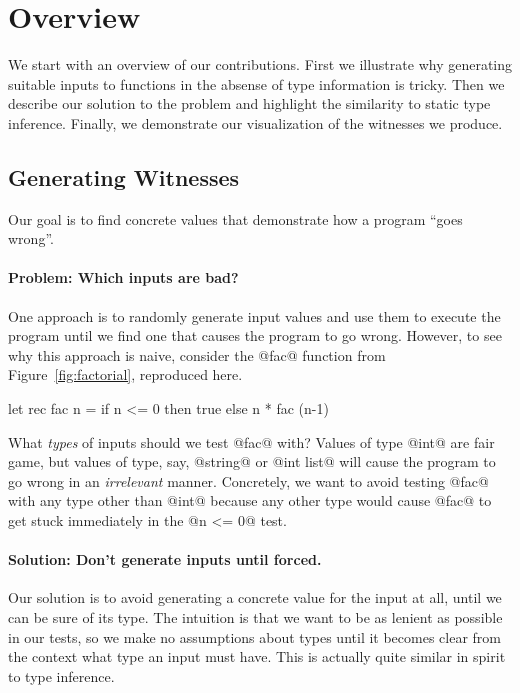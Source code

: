 \section{Overview}
\label{sec:overview}
We start with an overview of our contributions.
%
First we illustrate why generating suitable inputs to functions in the
absense of type information is tricky. 
%
Then we describe our solution to the problem and highlight the
similarity to static type inference.
%
Finally, we demonstrate our visualization of the witnesses we produce.

\subsection{Generating Witnesses}
\label{sec:generating-witnesses}
Our goal is to find concrete values that demonstrate how a
program ``goes wrong''.

\paragraph{Problem: Which inputs are bad?}
%
One approach is to randomly generate input values and use them to
execute the program until we find one that causes the program to go
wrong. However, to see why this approach is naive, consider the
@fac@ function from Figure~\ref{fig:factorial}, reproduced here.

\begin{code}
  let rec fac n =
    if n <= 0 then
      true
    else
      n * fac (n-1)
\end{code}

What \emph{types} of inputs should we test @fac@ with?
%
Values of type @int@ are fair game, but values of type, say,
@string@ or @int list@ will cause the program to go wrong
in an \emph{irrelevant} manner.
%
Concretely, we want to avoid testing @fac@ with any type other
than @int@ because any other type would cause @fac@ to get stuck
immediately in the @n <= 0@ test.

\paragraph{Solution: Don't generate inputs until forced.}
Our solution is to avoid generating a concrete value for the input at
all, until we can be sure of its type.
%
The intuition is that we want to be as lenient as possible in our tests,
so we make no assumptions about types until it becomes clear from the
context what type an input must have.
%
This is actually quite similar in spirit to type inference.

